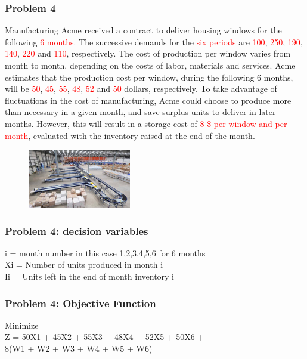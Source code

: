 \documentclass[10pt,svgnames,fragile]{beamer}
\begin{document}
\begin{frame}
\frametitle{Problem 4}

Manufacturing Acme received a contract to deliver housing windows for the following \textcolor{red}{6 months}. The successive demands for the \textcolor{red}{six periods} are \textcolor{red}{100}, \textcolor{red}{250}, \textcolor{red}{190}, \textcolor{red}{140}, \textcolor{red}{220} and \textcolor{red}{110}, respectively. The cost of production per window varies from month to month, depending on the costs of labor, materials and services. Acme estimates that the production cost per window, during the following 6 months, will be  \textcolor{red}{50}, \textcolor{red}{45}, \textcolor{red}{55}, \textcolor{red}{48}, \textcolor{red}{52} and \textcolor{red}{50} dollars, respectively. To take advantage of fluctuations in the cost of manufacturing, Acme could choose to produce more than necessary in a given month, and save surplus units to deliver in later months. However, this will result in a storage cost of \textcolor{red}{8 \$ per window and per month}, evaluated with the inventory raised at the end of the month.

\begin{figure}
\includegraphics[width=0.4\textwidth]{images/D.jpg}
\end{figure}

\end{frame}


\begin{frame}[label={sec:orge9abdcb}]{}
\frametitle{Problem 4: decision variables }

i = month number in this case 1,2,3,4,5,6 for 6 months\\

Xi = Number of units produced in month i\\

Ii = Units left in the end of month inventory i

\end{frame}

\begin{frame}[label={sec:orge9abdcb}]{}

\frametitle{Problem 4: Objective Function }
Minimize\\[1em]

Z = 50X1 + 45X2 + 55X3 + 48X4 + 52X5 + 50X6 +\\ 8(W1 + W2 + W3 + W4 + W5 + W6)\\


\end{frame}
\end{document}
